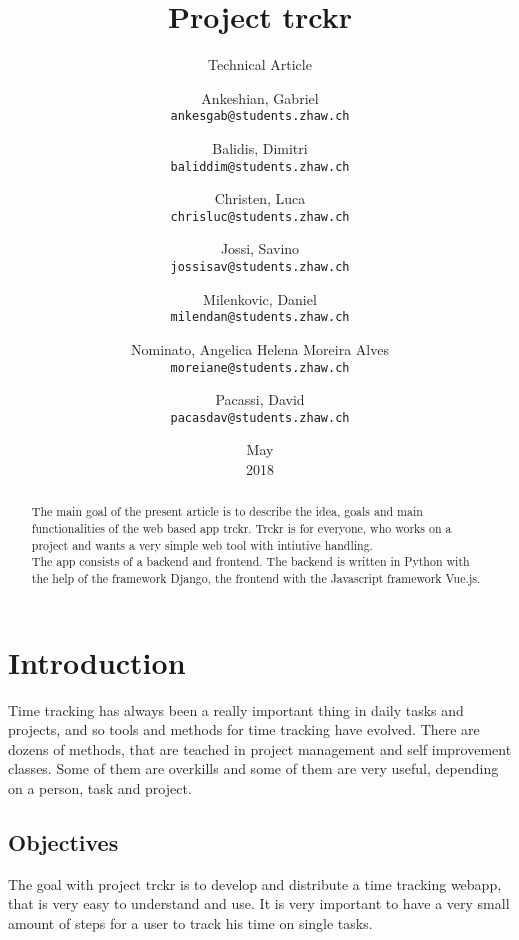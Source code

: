 \documentclass[a4paper, 12pt, headsepline]{scrartcl}
\title{Project trckr}
\subtitle{Technical Article}
\date{May \\ 2018}
\author{
Ankeshian, Gabriel\\
\texttt{ankesgab@students.zhaw.ch}
\and
Balidis, Dimitri\\
\texttt{baliddim@students.zhaw.ch}
\and
Christen, Luca\\
\texttt{chrisluc@students.zhaw.ch}
\and
Jossi, Savino\\
\texttt{jossisav@students.zhaw.ch}
\and
Milenkovic, Daniel\\
\texttt{milendan@students.zhaw.ch}
\and
Nominato, Angelica Helena Moreira Alves\\
\texttt{moreiane@students.zhaw.ch}
\and
Pacassi, David\\
\texttt{pacasdav@students.zhaw.ch}}
\begin{document}
\maketitle
\pagebreak

\begin{abstract}
The main goal of the present article is to describe the idea, goals and main functionalities of the web based app trckr. Trckr is for everyone,
who works on a project and wants a very simple web tool with intiutive handling.\\
The app consists of a backend and frontend. The backend is written in Python with the help of the framework Django, the frontend with the Javascript
framework Vue.js.

\end{abstract}

\pagebreak


\tableofcontents

\pagebreak

\section{Introduction}
Time tracking has always been a really important thing in daily tasks and projects, and so tools and methods for time tracking have evolved.
There are dozens of methods, that are teached in project management and self improvement classes. Some of them are overkills and some of them are
very useful, depending on a person, task and project.

\subsection{Objectives}
The goal with project trckr is to develop and distribute a time tracking webapp, that is very easy to understand and use. It is very important to
have a very small amount of steps for a user to track his time on single tasks.
\end{document}
